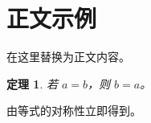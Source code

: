 \documentclass[reqno,12pt]{scrartcl}
\makeatletter
\theoremstyle{portable-statement}
\newtheorem{theorem}{定理}[section]
\theoremstyle{portable-statement}
\theoremstyle{portable-example}
\theoremstyle{portable-note}
\renewcommand{\proofname}{证明}
\renewenvironment{proof}[1][\proofname]{\par
  \pushQED{\qed}\normalfont\songfont
  \topsep6\p@\@plus6\p@\relax\trivlist
  \item[\hskip\labelsep{\headingfont\ChineseProofName{#1\@addpunct{.}}}]\ignorespaces
}{\popQED\endtrivlist\@endpefalse}
\makeatother
\begin{document}
\hypersetup{pageanchor=false}
\MakeSageCover
\MakeSageCopyright
\hypersetup{pageanchor=true}

\MakeSageContents
{}
\pagestyle{scrheadings}

\begin{abstract}
在这里写摘要；如果源 PDF 没有摘要，则删除本环境。
\end{abstract}

\section{正文示例}

在这里替换为正文内容。

\begin{theorem}\label{thm:sample}
若 \(a=b\)，则 \(b=a\)。
\end{theorem}

\begin{proof}
由等式的对称性立即得到。
\end{proof}
\end{document}
